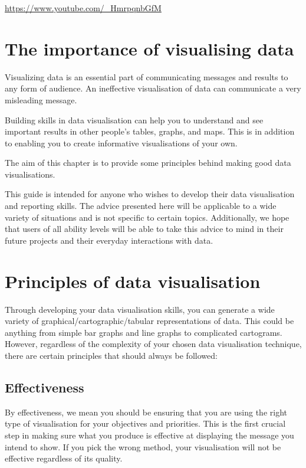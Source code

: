 \documentclass[
  titlepage]{book}
\begin{document}
\label{fig:unnamed-chunk-4}\url{https://www.youtube.com/_HmrpqnbGfM}

\hypertarget{the-importance-of-visualising-data}{%
\section{The importance of visualising data}\label{the-importance-of-visualising-data}}

Visualizing data is an essential part of communicating messages and results to any form of audience. An ineffective visualisation of data can communicate a very misleading message.

Building skills in data visualisation can help you to understand and see important results in other people's tables, graphs, and maps. This is in addition to enabling you to create informative visualisations of your own.

The aim of this chapter is to provide some principles behind making good data visualisations.

This guide is intended for anyone who wishes to develop their data visualisation and reporting skills. The advice presented here will be applicable to a wide variety of situations and is not specific to certain topics. Additionally, we hope that users of all ability levels will be able to take this advice to mind in their future projects and their everyday interactions with data.

\hypertarget{principles-of-data-visualisation}{%
\section{Principles of data visualisation}\label{principles-of-data-visualisation}}

Through developing your data visualisation skills, you can generate a wide variety of graphical/cartographic/tabular representations of data. This could be anything from simple bar graphs and line graphs to complicated cartograms. However, regardless of the complexity of your chosen data visualisation technique, there are certain principles that should always be followed:

\hypertarget{effectiveness}{%
\subsection{Effectiveness}\label{effectiveness}}

By effectiveness, we mean you should be ensuring that you are using the right type of visualisation for your objectives and priorities. This is the first crucial step in making sure what you produce is effective at displaying the message you intend to show. If you pick the wrong method, your visualisation will not be effective regardless of its quality.
\end{document}
